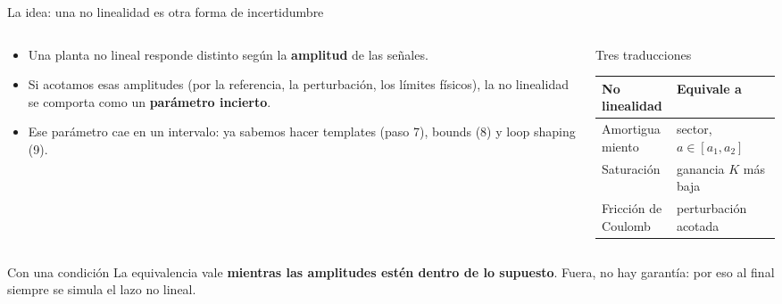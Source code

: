 \documentclass[aspectratio=169,11pt]{beamer}
\begin{document}
\begin{frame}{La idea: una no linealidad es otra forma de incertidumbre}
  \small
  \begin{columns}[T]
  \begin{column}{0.52\textwidth}
    \begin{itemize}
      \item Una planta no lineal responde distinto según la \textbf{amplitud} de las señales.
      \item Si acotamos esas amplitudes (por la referencia, la perturbación, los límites físicos), la no linealidad se comporta como un \textbf{parámetro incierto}.
      \item Ese parámetro cae en un intervalo: ya sabemos hacer templates (paso 7), bounds (8) y loop shaping (9).
    \end{itemize}
  \end{column}
  \begin{column}{0.44\textwidth}
    \begin{block}{Tres traducciones}
      \footnotesize
      \begin{tabular}{l|l}
        No linealidad & Equivale a\\\hline
        Amortiguamiento & sector, $a\in[a_1,a_2]$\\
        Saturación & ganancia $K$ más baja\\
        Fricción de Coulomb & perturbación acotada
      \end{tabular}
    \end{block}
  \end{column}
  \end{columns}
  \vspace{3pt}
  \begin{alertblock}{Con una condición}
    La equivalencia vale \textbf{mientras las amplitudes estén dentro de lo supuesto}. Fuera, no hay garantía: por eso al final siempre se simula el lazo no lineal.
  \end{alertblock}
\end{frame}
\end{document}
